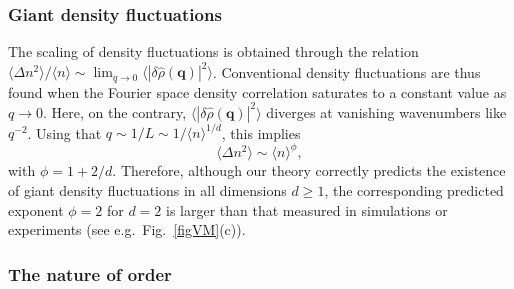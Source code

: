 \subsubsection{Giant density fluctuations}

The scaling of density fluctuations is obtained through the relation $\langle \Delta n^2 \rangle / \langle n \rangle \sim \lim_{q\to 0} \langle |\delta \hat{\rho}(\bm q)|^2 \rangle$.
Conventional density fluctuations are thus found when the Fourier space density correlation saturates to a constant value as $q \to 0$.
Here, on the contrary, $\langle |\delta \hat{\rho}(\bm q)|^2 \rangle$ diverges at vanishing wavenumbers like $q^{-2}$.
Using that $q \sim 1/L \sim 1/\langle n \rangle^{1/d}$, this implies
\begin{equation}
\langle \Delta n^2 \rangle \sim \langle n \rangle^\phi ,
\end{equation}
with $\phi = 1 + 2/d$.
Therefore, although our theory correctly predicts the existence of giant density fluctuations in all dimensions $d \ge 1$, 
the corresponding predicted exponent $\phi = 2$ for $d=2$ is larger than that measured in simulations or experiments (see e.g.\ Fig.~\ref{figVM}(c)).

\subsubsection{The nature of order}

